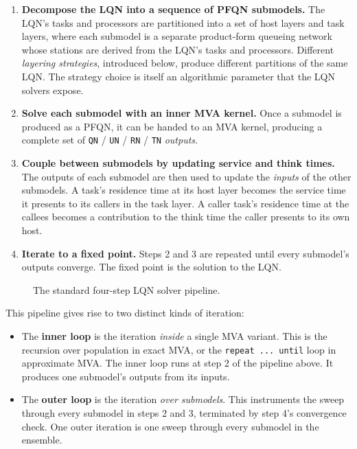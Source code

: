 \begin{enumerate}
\item \textbf{Decompose the LQN into a sequence of PFQN submodels.} The LQN's tasks and processors are partitioned into a set of host layers and task layers, where each submodel is a separate product-form queueing network whose stations are derived from the LQN's tasks and processors. Different \textit{layering strategies}, introduced below, produce different partitions of the same LQN. The strategy choice is itself an algorithmic parameter that the LQN solvers expose.

\item \textbf{Solve each submodel with an inner MVA kernel.} Once a submodel is produced as a PFQN, it can be handed to an MVA kernel, producing a complete set of \texttt{QN} / \texttt{UN} / \texttt{RN} / \texttt{TN} \textit{outputs}.

\item \textbf{Couple between submodels by updating service and think times.} The outputs of each submodel are then used to update the \textit{inputs} of the other submodels. A task's residence time at its host layer becomes the service time it presents to its callers in the task layer. A caller task's residence time at the callees becomes a contribution to the think time the caller presents to its own host.

\item \textbf{Iterate to a fixed point.} Steps 2 and 3 are repeated until every submodel's outputs converge. The fixed point is the solution to the LQN.
\end{enumerate}

\begin{figure}[h]
  \centering
  \resizebox{\textwidth}{!}{%
  }
  \caption[The four-step LQN solver pipeline]{
    The standard four-step LQN solver pipeline.
  }
  \label{fig:bg-four-step-pipeline}
\end{figure}

This pipeline gives rise to two distinct kinds of iteration:

\begin{itemize}
\item The \textbf{inner loop} is the iteration \textit{inside} a single MVA variant. This is the recursion over population in exact MVA, or the \texttt{repeat ... until} loop in approximate MVA. The inner loop runs at step 2 of the pipeline above. It produces one submodel's outputs from its inputs.
\item The \textbf{outer loop} is the iteration \textit{over submodels}. This instruments the sweep through every submodel in steps 2 and 3, terminated by step 4's convergence check. One outer iteration is one sweep through every submodel in the ensemble.
\end{itemize}

